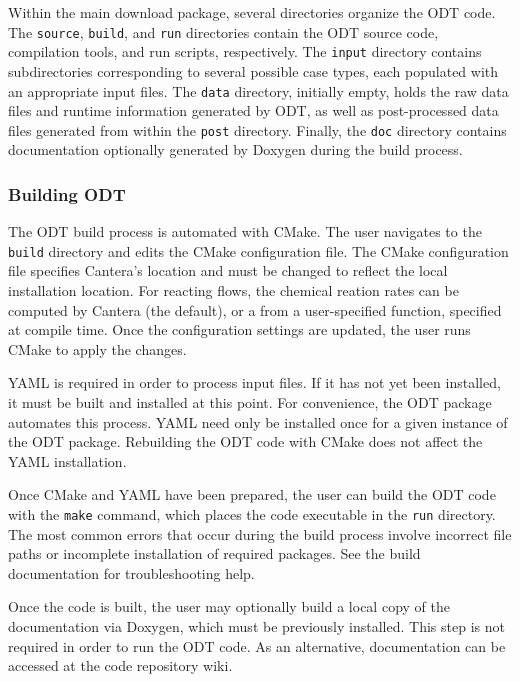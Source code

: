 \documentclass[preprint,12pt, a4paper]{elsarticle}
\begin{document}
Within the main download package, several directories organize the ODT code. The \texttt{source}, \texttt{build}, and \texttt{run} directories contain the ODT source code, compilation tools, and run scripts, respectively. The \texttt{input} directory contains subdirectories corresponding to several possible case types, each populated with an appropriate input files. The \texttt{data} directory, initially empty, holds the raw data files and runtime information generated by ODT, as well as post-processed data files generated from within the \texttt{post} directory. Finally, the \texttt{doc} directory contains documentation optionally generated by Doxygen \cite{vanHeesch_2018} during the build process. 

\subsubsection{Building ODT}

The ODT build process is automated with CMake. The user navigates to the \texttt{build} directory and edits the CMake configuration file. The CMake configuration file specifies Cantera's location and must be changed to reflect the local installation location. For reacting flows, the chemical reation rates can be computed by Cantera (the default), or a from a user-specified function, specified at compile time. Once the configuration settings are updated, the user runs CMake to apply the changes. 

YAML is required in order to process input files. If it has not yet been installed, it must be built and installed at this point. For convenience, the ODT package automates this process. YAML need only be installed once for a given instance of the ODT package. Rebuilding the ODT code with CMake does not affect the YAML installation. 

Once CMake and YAML have been prepared, the user can build the ODT code with the \texttt{make} command, which places the code executable in the \texttt{run} directory. The most common errors that occur during the build process involve incorrect file paths or incomplete installation of required packages. See the build documentation for troubleshooting help. 

Once the code is built, the user may optionally build a local copy of the documentation via Doxygen, which must be previously installed. This step is not required in order to run the ODT code. As an alternative, documentation can be accessed at the code repository wiki. 
\end{document}
